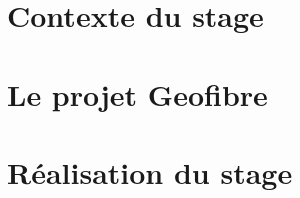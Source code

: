 \documentclass[a4paper, 12pt, onecolumn, openright, oneside]{report}
\begin{document}
  
  
  \setcounter{secnumdepth}{1} %
  \setcounter{tocdepth}{1}  %
  \tableofcontents
  
  \part{Contexte du stage}
  
  
  \part{Le projet Geofibre}
  
  \part{Réalisation du stage}
  
  
  
  
  \appendix
  \listoffigures
  
  
\end{document}
